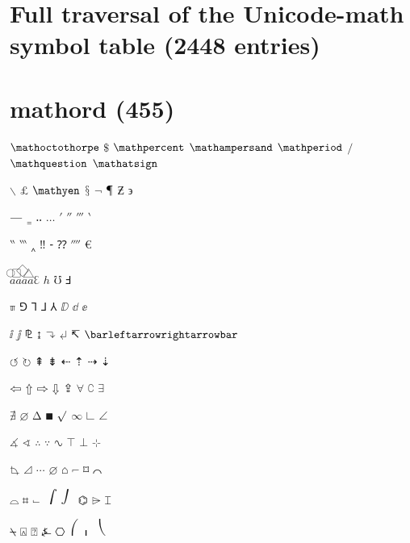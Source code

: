 \documentclass{article}
\begin{document}
\section*{Full traversal of the Unicode-math symbol table (2448 entries)}

\section*{mathord (455)}

$\mathoctothorpe$ $\mathdollar$ $\mathpercent$ $\mathampersand$ $\mathperiod$ $\mathslash$ $\mathquestion$ $\mathatsign$ \par
$\backslash$ $\mathsterling$ $\mathyen$ $\mathsection$ $\neg$ $\mathparagraph$ $\Zbar$ $\upbackepsilon$ \par
$\horizbar$ $\twolowline$ $\enleadertwodots$ $\unicodeellipsis$ $\prime$ $\dprime$ $\trprime$ $\backprime$ \par
$\backdprime$ $\backtrprime$ $\caretinsert$ $\Exclam$ $\hyphenbullet$ $\Question$ $\qprime$ $\euro$ \par
$\enclosecircle{a}$\quad{}$\enclosesquare{a}$\quad{}$\enclosediamond{a}$\quad{}$\enclosetriangle{a}$\quad{}$\Eulerconst$ $\Planckconst$ $\mho$ $\Finv$ \par
$\Bbbpi$ $\Game$ $\sansLturned$ $\sansLmirrored$ $\Yup$ $\mitBbbD$ $\mitBbbd$ $\mitBbbe$ \par
$\mitBbbi$ $\mitBbbj$ $\PropertyLine$ $\updownarrowbar$ $\linefeed$ $\carriagereturn$ $\barovernorthwestarrow$ $\barleftarrowrightarrowbar$ \par
$\acwopencirclearrow$ $\cwopencirclearrow$ $\nHuparrow$ $\nHdownarrow$ $\leftdasharrow$ $\updasharrow$ $\rightdasharrow$ $\downdasharrow$ \par
$\leftwhitearrow$ $\upwhitearrow$ $\rightwhitearrow$ $\downwhitearrow$ $\whitearrowupfrombar$ $\forall$ $\complement$ $\exists$ \par
$\nexists$ $\varnothing$ $\increment$ $\QED$ $\surd$ $\infty$ $\rightangle$ $\angle$ \par
$\measuredangle$ $\sphericalangle$ $\therefore$ $\because$ $\sinewave$ $\top$ $\bot$ $\hermitmatrix$ \par
$\measuredrightangle$ $\varlrtriangle$ $\unicodecdots$ $\diameter$ $\house$ $\invnot$ $\sqlozenge$ $\profline$ \par
$\profsurf$ $\viewdata$ $\turnednot$ $\inttop$ $\intbottom$ $\varhexagonlrbonds$ $\conictaper$ $\topbot$ \par
$\APLnotbackslash$ $\APLboxupcaret$ $\APLboxquestion$ $\rangledownzigzagarrow$ $\hexagon$ $\lparenuend$ $\lparenextender$ $\lparenlend$ \par
\end{document}
